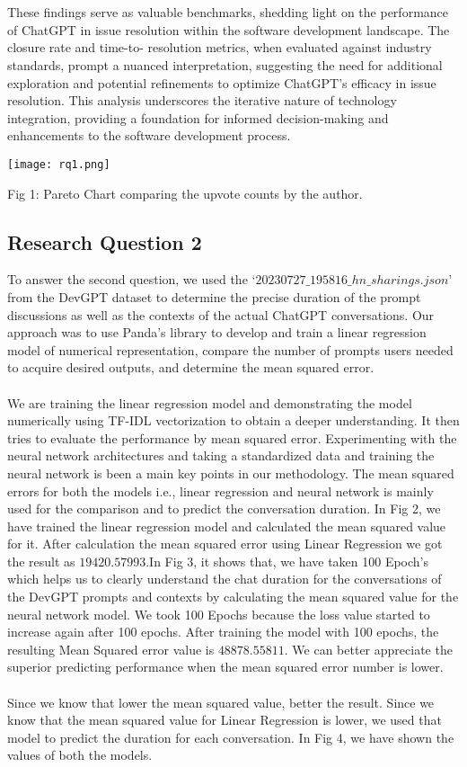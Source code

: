 \documentclass[journal]{IEEEtran}
\begin{document}
\\ \\
These findings serve as valuable benchmarks, shedding light on the performance of ChatGPT in issue resolution within the software development landscape. The closure rate and time-to- resolution metrics, when evaluated against industry standards, prompt a nuanced interpretation, suggesting the need for additional exploration and potential refinements to optimize ChatGPT's efficacy in issue resolution. This analysis underscores the iterative nature of technology integration, providing a foundation for informed decision-making and enhancements to the software development process.

\begin{center}
     \texttt{[image: rq1.png]}
     \caption{Fig 1: Pareto Chart comparing the upvote counts by the author.}
\end{center}

\subsection{Research Question 2}
To answer the second question, we used the $‘20230727\_195816\_hn\_sharings.json’$ from the DevGPT dataset to determine the precise duration of the prompt discussions as well as the contexts of the actual ChatGPT conversations. Our approach was to use Panda's library to develop and train a linear regression model of numerical representation, compare the number of prompts users needed to acquire desired outputs, and determine the mean squared error.
\\ \\
We are training the linear regression model and demonstrating the model numerically using TF-IDL vectorization to obtain a deeper understanding. It then tries to evaluate the performance by mean squared error. Experimenting with the neural network architectures and taking a standardized data and training the neural network is been a main key points in our methodology. The mean squared errors for both the models i.e., linear regression and neural network is mainly used for the comparison and to predict the conversation duration. In Fig 2, we have trained the linear regression model and calculated the mean squared value for it. After calculation the mean squared error using Linear Regression we got the result as $19420.57993$.In Fig 3, it shows that, we have taken 100 Epoch’s which helps us to clearly understand the chat duration for the conversations of the DevGPT prompts and contexts by calculating the mean squared value for the neural network model. We took 100 Epochs because the loss value started to increase again after 100 epochs. After training the model with 100 epochs, the resulting Mean Squared error value is $48878.55811$. We can better appreciate the superior predicting performance when the mean squared error number is lower.
\\ \\
Since we know that lower the mean squared value, better the result. Since we know that the mean squared value for Linear Regression is lower, we used that model to predict the duration for each conversation. In Fig 4, we have shown the values of both the models.
\end{document}
